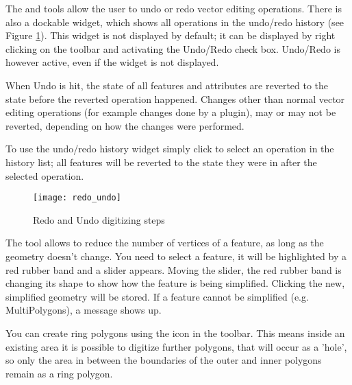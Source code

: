 
The  and  tools
allow the user to undo or redo vector editing operations. There is also a dockable
widget, which shows all operations in the undo/redo history (see
Figure \ref{fig:vector_redoundo}). This widget is not displayed by
default; it can be displayed by right clicking on the toolbar and activating the
Undo/Redo check box. Undo/Redo is however active, even if the widget is not
displayed.

When Undo is hit, the state of all features and attributes are reverted to the
state before the reverted operation happened. Changes other than normal vector
editing operations (for example changes done by a plugin), may or may not be
reverted, depending on how the changes were performed.

To use the undo/redo history widget simply click to select an operation in the
history list; all features will be reverted to the state they were in after
the selected operation.

\begin{figure}[ht]
   \centering
   \texttt{[image: redo\_undo]}
   \caption{Redo and Undo digitizing steps \nixcaption}\label{fig:vector_redoundo}
\end{figure}


The  tool allows to reduce the
number of vertices of a feature, as long as the geometry doesn't change. You
need to select a feature, it will be highlighted by a red rubber band and a
slider appears. Moving the slider, the red rubber band is changing its shape
to show how the feature is being simplified. Clicking  the new,
simplified geometry will be stored. If a feature cannot be simplified (e.g.
MultiPolygons), a message shows up.


You can create ring polygons using the 
icon in the toolbar. This means inside an existing area it is
possible to digitize further polygons, that will occur as a 'hole', so only
the area in between the boundaries of the outer and inner polygons remain as
a ring polygon.


